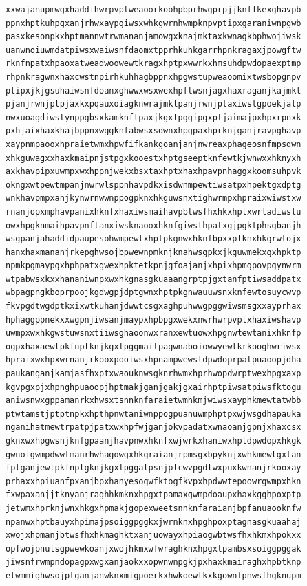 \documentclass[11pt,letterpaper]{exam}
\begin{document}
\begin{questions}
\begin{verbatim}
xxwajanupmwgxhaddihwrpvptweaoorkoohpbprhwgprpjjknffkexghavpb
ppnxhptkuhpgxanjrhwxaypgiwsxwhkgwrnhwmpknpvptipxgaraniwnpgwb
pasxkesonpkxhptmannwtrwmananjamowgxknajmktaxkwnagkbphwojiwsk
uanwnoiuwmdatpiwsxwaiwsnfdaomxtpprhkuhkgarrhpnkragaxjpowgftw
rknfnpatxhpaoxatweadwoowewtkragxhptpxwwrkxhmsuhdpwdopaexptmp
rhpnkragwnxhaxcwstnpirhkuhhagbppnxhpgwstupweaoomixtwsbopgnpv
ptipxjkjgsuhaiwsnfdoanxghwwxwsxwexhpftwsnjagxhaxraganjkajmkt
pjanjrwnjptpjaxkxpqauxoiagknwrajmktpanjrwnjptaxiwstgpoekjatp
nwxuoagdiwstynppgbsxkamknftpaxjkgxtpggipgxptjaimajpxhpxrpnxk
pxhjaixhaxkhajbppnxwggknfabwsxsdwnxhpgpaxhprknjganjravpghavp
xaypnmpaooxhpraietwmxhpwfifkankgoanjanjnwreaxphageosnfmpsdwn
xhkguwagxxhaxkmaipnjstpgxkooestxhptgseeptknfewtkjwnwxxhknyxh
axkhavpipxuwmpxwxhppnjwekxbsxtaxhptxhaxhpavpnhaggxkoomsuhpvk
okngxwtpewtmpanjnwrwlsppnhavpdkxisdwnmpewtiwsatpxhpektgxdptg
wnkhavpmpxanjkynwrnwwnppogpknxhkguwsnxtighwrmpxhpraixwiwstxw
rnanjopxmphavpanixhknfxhaxiwsmaihavpbtwsfhxhkxhptxwrtadiwstu
owxhpgknmaihpavpnftanxiwsknaooxhknfgiwsthpatxgjpgktphsgbanjh
wsgpanjahaddidpaupesohwmpewtxhptpkgnwxhknfbpxxptknxhkgrwtojx
hanxhaxmananjrkepghwsojbpwewnpmknjknahwsgpkxjkguwmekxgxhpktp
npmkpgmaypgxhphpatxgwexhpktetkpnjgfoajanjxhpixhpmgpovpgynwrm
wtpabwsxkxxhananiwnpxwxhkgnasgkuaaangrptpjgxtanfptiwsaddpatx
wbpagpngkboprpoojkgdwgpjdptgwnxhptpkgnwauuwsnxknfewtosuycwvp
fkvpgdtwgdptkxixwtkuhanjdwwtcsgxaghpuhwwgpggwiwsmsgxxayprhax
hphaggppnekxxwgpnjiwsanjmaypxhpbpgxwekxnwrhwrpvptxhaxiwshavp
uwmpxwxhkgwstuwsnxtiiwsghaoonwxranxewtuowxhpgnwtewtanixhknfp
ogpxhaxaewtpkfnptknjkgxtpggmaitpagwnaboiowwyewtkrkooghwriwsx
hpraixwxhpxwrnanjrkooxpooiwsxhpnampwewstdpwdoprpatpuaoopjdha
paukanganjkamjasfhxptxwaouknwsgknrhwmxhprhwopdwrptwexhpgxaxp
kgvpgxpjxhpnghpuaoopjhptmakjganjgakjgxairhptpiwsatpiwsfktogu
aniwsnwxgppamanrkxhwsxtsnnknfaraietwmhkmjwiwsxayphkmewtatwbb
ptwtamstjptptnpkxhpthpnwtaniwnppogpuanuwmphptpxwjwsgdhapauka
nganihatmewtrpatpjpatxwxhpfwjganjokvpadatxwnaoanjgpnjxhaxcsx
gknxwxhpgwsnjknfgpaanjhavpnwxhknfxwjwrkxhaniwxhptdpwdopxhkgk
gwnoigwmpdwwtmanrhwhagowgxhkgraianjrpmsgxbpyknjxwhkmewtgxtan
fptganjewtpkfnptgknjkgxtpggatpsnjptcwvpgdtwxpuxkwnanjrkooxay
prhaxxhpiuanfpxanjbpxhanyesogwfktogfkvpxhpdwwtepoowrgwmpxhkn
fxwpaxanjjtknyanjraghhkmknxhpgxtpamaxgwmpdoaupxhaxkgghpoxptp
jetwmxhprknjwnxhkgxhpmakjgopexweetsnnknfaraianjbpfanuaooknfw
npanwxhptbauyxhpimajpsoiggpggkxjwrnknxhpghpoxptagnasgkuaahaj
xwojxhpmanjbtwsfhxhkmaghktxanjuowayxhpiaogwbtwsfhxhkmxhpokxx
opfwojpnutsgpwewkoanjxwojhkmxwfwraghknxhpgxtpambsxsoiggpggak
jiwsnfrwmpndopagpxwgxanjaokxxopwnwnpgkjpxhaxkmairaghxhpbtknp
etwmmighwsojptganjanwknxmigpoerkxhwkoewtkxkgownfpnwsfhgknupm

\end{verbatim}
\end{questions}
\end{document}
